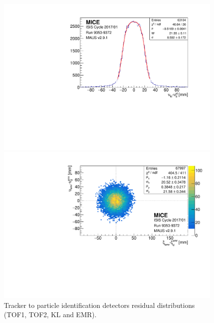 \begin{figure} [!htb]
	\begin{minipage}[b]{.475\textwidth}
		\centering
		\includegraphics[width=\textwidth]{data_test/kl_y_res.pdf}
	\end{minipage}
	\hfill
	\begin{minipage}[b]{.475\textwidth}
		\centering
		\includegraphics[width=\textwidth]{data_test/emr_xy_res.pdf}
	\end{minipage}
	\caption{Tracker to particle identification detectors residual distributions (TOF1, TOF2, KL and EMR).}
	\label{fig:pid_residuals}
\end{figure}

